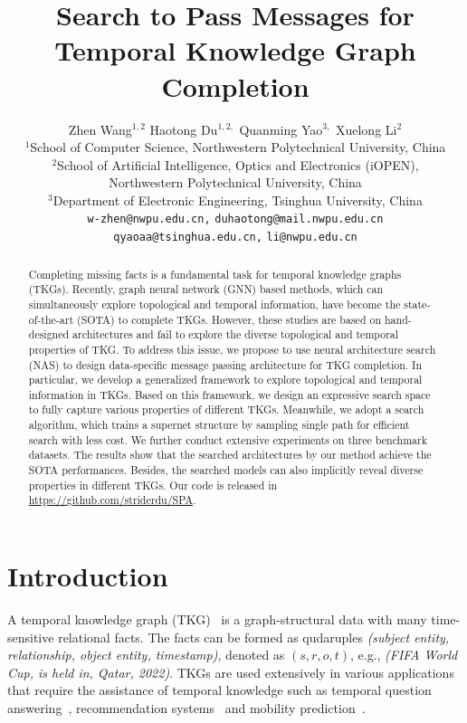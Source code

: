 \documentclass[11pt]{article}
\title{Search to Pass Messages for Temporal Knowledge Graph Completion}
\author{
Zhen Wang$^{1,2}$ \quad  
Haotong Du$^{1,2,}$\footnotemark[1] \quad 
Quanming Yao$^{3,}$\footnotemark[1] \quad 
Xuelong Li$^2$ \\
	$^1$School of Computer Science, Northwestern Polytechnical University, China \\
	$^2$School of Artificial Intelligence, Optics and Electronics (iOPEN), \\ Northwestern Polytechnical University, China \\
	$^3$Department of Electronic Engineering, Tsinghua University, China \\
	\texttt{w-zhen@nwpu.edu.cn,}
	\texttt{duhaotong@mail.nwpu.edu.cn}\\
	\texttt{qyaoaa@tsinghua.edu.cn,}
	\texttt{li@nwpu.edu.cn}}
\begin{document}
\begin{abstract}
	
Completing missing facts is a fundamental task for temporal knowledge graphs (TKGs).
Recently,
graph neural network (GNN) based methods, 
which can simultaneously explore topological and temporal information, 
have become the state-of-the-art (SOTA) to complete TKGs. 
However, 
these studies are based on hand-designed architectures and fail to explore the diverse topological and temporal properties of TKG.
To address this issue, 
we propose to use neural architecture search (NAS) to design data-specific message passing architecture for TKG completion.
In particular, 
we develop a generalized framework to explore topological and temporal information in TKGs.
Based on this framework, we design an expressive search space to fully capture various properties of different TKGs. 
Meanwhile,
we adopt a search algorithm, which trains a supernet structure by sampling single path for efficient search with less cost.
We further conduct extensive experiments on three benchmark datasets.
The results show that the searched architectures by our method achieve the SOTA performances.
Besides, 
the searched models can also implicitly reveal diverse properties in different TKGs.
Our code is released in \url{https://github.com/striderdu/SPA}. 

\end{abstract}

\section{Introduction}

A temporal knowledge graph (TKG)~\citep{cai2022temporal}
is a graph-structural data with many time-sensitive relational facts. 
The facts can be formed as qudaruples 
\textit{(subject entity, relationship, object entity, timestamp)}, 
denoted as $(s, r, o, t)$, 
e.g., 
\emph{(FIFA World Cup, is held in, Qatar, 2022)}. 
TKGs are used extensively in various applications that 
require the assistance of temporal knowledge 
such as 
temporal question answering~\citep{saxena-etal-2021-question}, 
recommendation systems~\citep{zhao2021time} 
and mobility prediction~\citep{wang2021spatio}.
\end{document}
